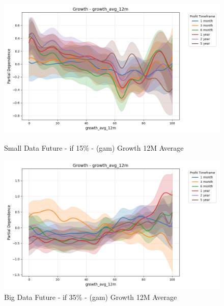 \documentclass[11pt,english,a4paper,hidelinks]{book}
\begin{document}
\begin{figure}[H]
    \centering
    \begin{minipage}{0.48\textwidth}
        \centering
        \includegraphics[width=\textwidth]{images/code/models/general_regression/splines/2D/Small Data future - IF/growth_growth_avg_12m.png}
        \caption{Small Data Future - \acrshort{if} 15\% - (\acrshort{gam}) Growth 12M Average}
        \label{fig:spline_growth_growth_avg_12m}
    \end{minipage}\hfill
    \begin{minipage}{0.48\textwidth}
        \centering
        \includegraphics[width=\textwidth]{images/code/models/general_regression/splines/2D/Big Data future - IF HARD Balanced/growth_growth_avg_12m.png}
        \caption{Big Data Future - \acrshort{if} 35\% - (\acrshort{gam}) Growth 12M Average}
        \label{fig:spline_growth_growth_avg_12m_balanced}
    \end{minipage}
\end{figure}
\end{document}
